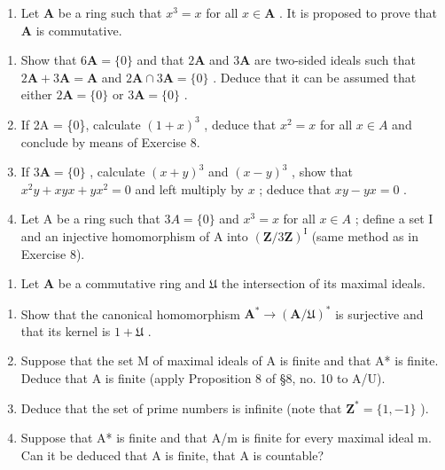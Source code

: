 \begin{enumerate}
\def\labelenumi{\arabic{enumi}.}
\setcounter{enumi}{8}
\tightlist
\item
  Let \(\mathbf{A}\) be a ring such that \(x^3 = x\) for all \(x \in \mathbf{A}\) . It is proposed to prove that \(\mathbf{A}\) is commutative.
\end{enumerate}

\begin{enumerate}
\def\labelenumi{(\alph{enumi})}
\item
  Show that \(6\mathbf{A} = \{0\}\) and that \(2\mathbf{A}\) and \(3\mathbf{A}\) are two-sided ideals such that \(2\mathbf{A} + 3\mathbf{A} = \mathbf{A}\) and \(2\mathbf{A} \cap 3\mathbf{A} = \{0\}\) . Deduce that it can be assumed that either \(2\mathbf{A} = \{0\}\) or \(3\mathbf{A} = \{0\}\) .
\item
  If 2A = \{0\}, calculate \((1 + x)^{3}\) , deduce that \(x^{2} = x\) for all \(x \in A\) and conclude by means of Exercise 8.
\item
  If \(3\mathbf{A} = \{0\}\) , calculate \((x + y)^3\) and \((x - y)^3\) , show that \(x^2y + xyx + yx^2 = 0\) and left multiply by \(x\) ; deduce that \(xy - yx = 0\) .
\item
  Let A be a ring such that \(3A = \{0\}\) and \(x^{3} = x\) for all \(x \in A\) ; define a set I and an injective homomorphism of A into \((\mathbf{Z}/3\mathbf{Z})^{\mathrm{I}}\) (same method as in Exercise 8).
\end{enumerate}

\begin{enumerate}
\def\labelenumi{\arabic{enumi}.}
\setcounter{enumi}{9}
\tightlist
\item
  Let \(\mathbf{A}\) be a commutative ring and \(\mathfrak{U}\) the intersection of its maximal ideals.
\end{enumerate}

\begin{enumerate}
\def\labelenumi{(\alph{enumi})}
\item
  Show that the canonical homomorphism \(\mathbf{A}^* \to (\mathbf{A} / \mathfrak{U})^*\) is surjective and that its kernel is \(1 + \mathfrak{U}\) .
\item
  Suppose that the set M of maximal ideals of A is finite and that A* is finite. Deduce that A is finite (apply Proposition 8 of §8, no. 10 to A/U).
\item
  Deduce that the set of prime numbers is infinite (note that \(\mathbf{Z}^{*} = \{1, -1\}\) ).
\item
  Suppose that A* is finite and that A/m is finite for every maximal ideal m. Can it be deduced that A is finite, that A is countable?
\end{enumerate}

